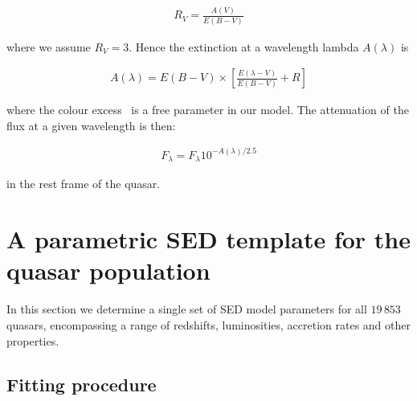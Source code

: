 \begingroup\makeatletter{}\check@mathfonts
\begin{eqnarray}
  R_V = \frac{A(V)}{E(B-V)}
\end{eqnarray}
\endgroup

\noindent where we assume $R_V = 3$. 
Hence the extinction at a wavelength lambda $A(\lambda)$ is 

\begingroup\makeatletter{}\check@mathfonts
\begin{eqnarray}
  A(\lambda) = E(B-V) \times \left[ \frac{E(\lambda-V)}{E(B-V)} + R \right] 
\end{eqnarray}
\endgroup

\noindent where the colour excess \ebv\, is a free parameter in our model. 
The attenuation of the flux at a given wavelength is then:

\begingroup\makeatletter{}\check@mathfonts
\begin{eqnarray}
  F_\lambda = F_\lambda10^{-A(\lambda)/2.5}
\end{eqnarray}
\endgroup

\noindent in the rest frame of the quasar. 

\section[SED template]{A parametric SED template for the quasar population} 
\label{sec:ch5-standardmodel}

In this section we determine a single set of SED model parameters for all $19\,853$ quasars, encompassing a range of redshifts, luminosities, accretion rates and other properties. 

\subsection{Fitting procedure}

